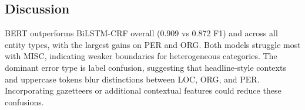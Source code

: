 \subsection{Discussion}
BERT outperforms BiLSTM-CRF overall (0.909 vs 0.872 F1) and across all entity types, with the largest gains on PER and ORG. Both models struggle most with MISC, indicating weaker boundaries for heterogeneous categories. The dominant error type is label confusion, suggesting that headline-style contexts and uppercase tokens blur distinctions between LOC, ORG, and PER. Incorporating gazetteers or additional contextual features could reduce these confusions.

